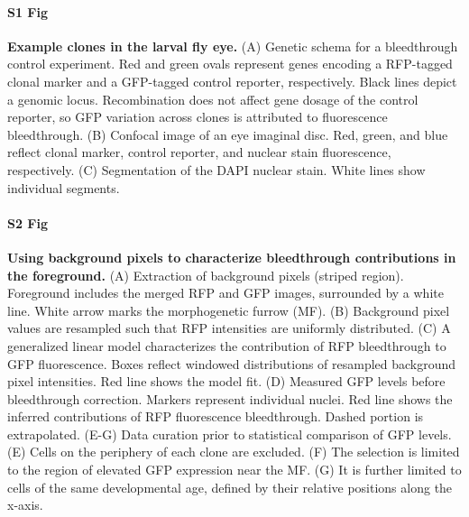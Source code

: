 \documentclass[10pt,letterpaper]{article}
\begin{document}
\paragraph*{S1 Fig} 
\label{S1_Fig} 
{\bf Example clones in the larval fly eye.} (A) Genetic schema for a bleedthrough control experiment. Red and green ovals represent genes encoding a RFP-tagged clonal marker and a GFP-tagged control reporter, respectively. Black lines depict a genomic locus. Recombination does not affect gene dosage of the control reporter, so GFP variation across clones is attributed to fluorescence bleedthrough. (B) Confocal image of an eye imaginal disc. Red, green, and blue reflect clonal marker, control reporter, and nuclear stain fluorescence, respectively. (C) Segmentation of the DAPI nuclear stain. White lines show individual segments.

\paragraph*{S2 Fig} 
\label{S2_Fig} 
{\bf Using background pixels to characterize bleedthrough contributions in the foreground.} (A) Extraction of background pixels (striped region). Foreground includes the merged RFP and GFP images, surrounded by a white line. White arrow marks the morphogenetic furrow (MF). (B) Background pixel values are resampled such that RFP intensities are uniformly distributed. (C) A generalized linear model characterizes the contribution of RFP bleedthrough to GFP fluorescence. Boxes reflect windowed distributions of resampled background pixel intensities. Red line shows the model fit. (D) Measured GFP levels before bleedthrough correction. Markers represent individual nuclei. Red line shows the inferred contributions of RFP fluorescence bleedthrough. Dashed portion is extrapolated. (E-G) Data curation prior to statistical comparison of GFP levels. (E) Cells on the periphery of each clone are excluded. (F) The selection is limited to the region of elevated GFP expression near the MF. (G) It is further limited to cells of the same developmental age, defined by their relative positions along the x-axis.
\end{document}
